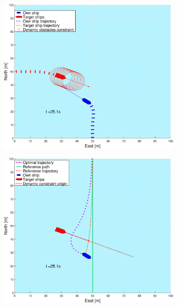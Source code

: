 \begin{figure}[ht!]
\begin{subfigure}[b]{0.499\textwidth}
        \subcaption{}
    \end{subfigure}
    \hfill
    \\
    \begin{subfigure}[b]{0.49\textwidth}
        \centering
        \includegraphics[width=\textwidth]{Images/Figures/enkel_SO/_Simple_1fig1_time=25}
        \subcaption{}
    \end{subfigure}
    \hfill
    \begin{subfigure}[b]{0.499\textwidth}
        \centering
        \includegraphics[width=\textwidth]{Images/Figures/enkel_SO/_Simple_1fig999_time=25}

\end{subfigure}
\end{figure}
